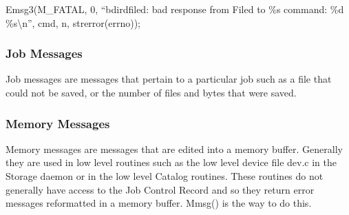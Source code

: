 Emsg3(M\_FATAL, 0, ``bdird\lt{}filed: bad response from Filed to \%s command:
\%d \%s\textbackslash{}n'',  cmd, n, strerror(errno)); 

\subsubsection*{Job Messages}

Job messages are messages that pertain to a particular job such as a file that
could not be saved, or the number of files and bytes that were saved. 

\subsubsection*{Memory Messages}

Memory messages are messages that are edited into a memory buffer. Generally
they are used in low level routines such as the low level device file dev.c in
the Storage daemon or in the low level Catalog routines. These routines do not
generally have access to the Job Control Record and so they return error
messages reformatted in a memory buffer. Mmsg() is the way to do this. 
